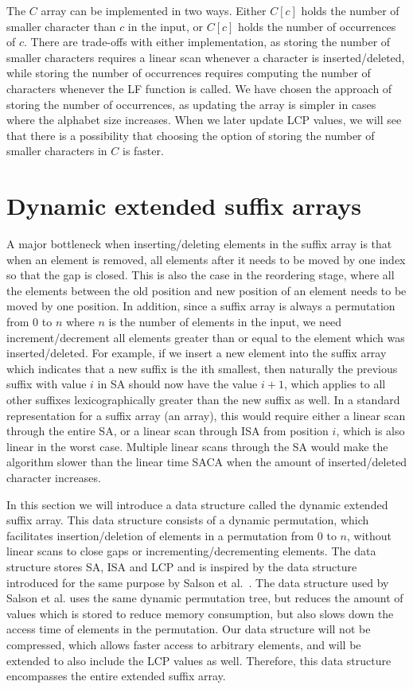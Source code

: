 
 The $C$ array can be implemented in two ways. Either $C[c]$
holds the number of smaller character than $c$ in the input, or $C[c]$ holds the number of
occurrences of $c$. There are trade-offs with either implementation, as storing the number
of smaller characters requires a linear scan whenever a character is inserted/deleted,
while storing the number of occurrences requires computing the number of characters
whenever the LF function is called. We have chosen the approach of storing the number of
occurrences, as updating the array is simpler in cases where the alphabet size increases.
When we later update LCP values, we will see that there is a possibility that choosing the
option of storing the number of smaller characters in $C$ is faster. \section{Dynamic
extended suffix arrays}

A major bottleneck when inserting/deleting elements in the suffix array is that when an
element is removed, all elements after it needs to be moved by one index so that the gap
is closed. This is also the case in the reordering stage, where all the elements between
the old position and new position of an element needs to be moved by one position. In
addition, since a suffix array is always a permutation from $0$ to $n$ where $n$ is the
number of elements in the input, we need increment/decrement all elements greater than or
equal to the element which was inserted/deleted. For example, if we insert a new element
into the suffix array which indicates that a new suffix is the ith smallest, then
naturally the previous suffix with value $i$ in SA should now have the value $i + 1$,
which applies to all other suffixes lexicographically greater than the new suffix as well.
In a standard representation for a suffix array (an array), this would require either a
linear scan through the entire SA, or a linear scan through ISA from position $i$, which
is also linear in the worst case. Multiple linear scans through the SA would make the
algorithm slower than the linear time SACA when the amount of inserted/deleted character
increases. 

In this section we will introduce a data structure called the dynamic extended suffix
array. This data structure consists of a dynamic permutation, which facilitates
insertion/deletion of elements in a permutation from $0$ to $n$, without linear scans to
close gaps or incrementing/decrementing elements. The data structure stores SA, ISA and
LCP and is inspired by the data structure introduced for the same purpose by Salson et
al.~\cite{DynamicExtendedSuffixArrays}. The data structure used by Salson et al. uses the
same dynamic permutation tree, but reduces the amount of values which is stored to reduce
memory consumption, but also slows down the access time of elements in the permutation.
Our data structure will not be compressed, which allows faster access to arbitrary
elements, and will be extended to also include the LCP values as well. Therefore, this
data structure encompasses the entire extended suffix array.

